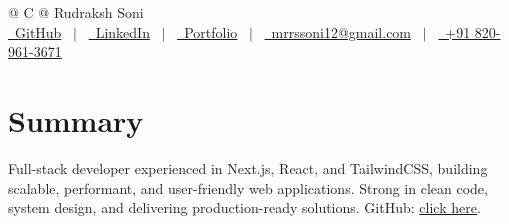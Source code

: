 \documentclass[a4paper,12pt]{article}
\begin{document}
\pagestyle{empty} 



\begin{tabularx}{\linewidth}{@{} C @{}}
\Huge{Rudraksh Soni} \\[7.5pt]
\href{https://github.com/rudrakshSoni-dev}{\raisebox{-0.05\height}\faGithub\ GitHub} \ $|$ \ 
\href{https://www.linkedin.com/in/rudraksh-soni-7674ab2aa/}{\raisebox{-0.05\height}\faLinkedin\ LinkedIn} \ $|$ \ 
\href{https://dev-portfolio-rudraksh.netlify.app/}{\raisebox{-0.05\height}\faGlobe \ Portfolio} \ $|$ \ 
\href{mailto://mrrssoni12@gmail.com}
{\raisebox{-0.05\height}\faEnvelope \ mrrssoni12@gmail.com} \ $|$ \ 
\href{tel:+918209613671}{\raisebox{-0.05\height}\faMobile \ +91 820-961-3671} \\
\end{tabularx}


\section{Summary}
Full-stack developer experienced in Next.js, React, and TailwindCSS, building scalable, performant, and user-friendly web applications. Strong in clean code, system design, and delivering production-ready solutions. GitHub: \href{https://github.com/rudrakshSoni-dev}{click
 here}. 
\end{document}
